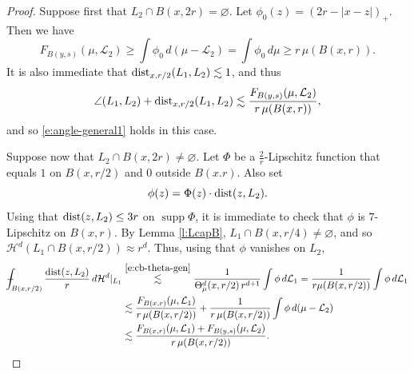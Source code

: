 \documentclass[11pt]{amsart}
\newcommand{\LL}{{\mathcal L}}
\newcommand{\dist}{{\rm dist}}
\newcommand{\supp}{\operatorname{supp}}
\def\Xint#1{\mathchoice
{\XXint\displaystyle\textstyle{#1}}%
{\XXint\textstyle\scriptstyle{#1}}%
{\XXint\scriptstyle\scriptscriptstyle{#1}}%
{\XXint\scriptscriptstyle\scriptscriptstyle{#1}}%
\!\int}
\def\XXint#1#2#3{{\setbox0=\hbox{$#1{#2#3}{\int}$ }
\vcenter{\hbox{$#2#3$ }}\kern-.58\wd0}}
\def\avint{\Xint-}
\theoremstyle{definition}
\theoremstyle{remark}
\numberwithin{equation}{section}
\def\cH{{\mathcal{H}}}
\def\lec{\lesssim}
\def\lec{\lesssim}
\begin{document}
\begin{proof}
Suppose first that $L_2\cap B(x,2r)= \varnothing$. Let $\phi_0(z)=(2r-|x-z|)_+$.
Then we have
$$F_{B(y,s)}(\mu,\LL_{2})\geq \int \phi_0\,d(\mu-\LL_2)= \int \phi_0\,d\mu\geq r\,\mu(B(x,r)).$$
It is also immediate that 
$\dist_{x,r/2}(L_1,L_2)\lec 1$, and thus
$$\angle(L_1,L_2)+\dist_{x,r/2}(L_1,L_2)\lec \frac{ F_{B(y,s)}(\mu,\LL_{2})}{{r\, \mu(B(x,r))}},$$
and so \eqref{e:angle-general1} holds in this case.

Suppose now that $L_2\cap B(x,2r)\neq \varnothing$.
	Let $\Phi$ be a $\frac{2}{r}$-Lipschitz function that equals $1$ on $B(x,r/2)$ and $0$ outside $B(x.r)$. Also set 
	\[
	\phi(z) = \Phi (z)\cdot  \dist(z,{ L_2}).
	\]
	Using that  $\dist(z,{ L_2})\leq3r$ on $\supp\Phi$,
	it is immediate to check that $\phi$ is { $7$-Lipschitz} on $B(x,r)$. 
	By Lemma \ref{l:LcapB}, {$L_1\cap B(x,r/4)\neq\varnothing$}, and so $\cH^{d}({ L_1}\cap B(x,r/2))\approx r^{d}$. Thus, using that $\phi$ vanishes on $L_2$,
	\begin{align}\label{int-est}
	\avint_{B(x,r/2)} \frac{\dist(z,L_{2})}{r} \,d\cH^{d}|_{L_{1}}
	& \stackrel{\eqref{e:cb-theta-gen}}{\lec}  \frac1{\Theta^d_{\mu}(x,r/2)\, r^{d+1}}\int \phi \,d\LL_{1} 
	= \frac{1}{r\mu(B(x,r/2))}\int \phi \,d\LL_{1} \\
	& \lec \frac{F_{B(x,r)}(\mu,\LL_{1})}{r\,\mu(B(x,r/2))}
	+ \frac{1}{r\,\mu(B(x,r/2))} \int  \phi \,d(\mu-\LL_2) \nonumber\\
	& \lesssim \frac{ F_{B(x,r)}(\mu,\LL_{1}) + F_{B(y,s)}(\mu,\LL_{2})}{r\,\mu(B(x,r/2))}.\nonumber
	\end{align}
	

\end{proof}
\end{document}

